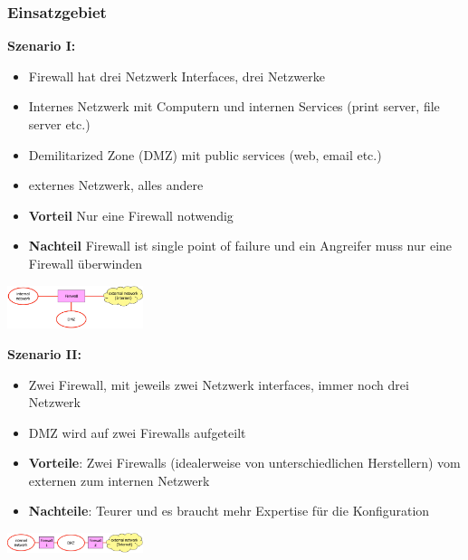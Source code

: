\documentclass{report}
\newenvironment{Figure}
	{\par\medskip\noindent\minipage{\linewidth}}
	{\endminipage\par\medskip}
\theoremstyle{definition}
\theoremstyle{example}
\begin{document}
		\subsubsection{Einsatzgebiet}
\textbf{Szenario I:}\\
\begin{itemize}
	\item Firewall hat drei Netzwerk Interfaces, drei Netzwerke
	\item Internes Netzwerk mit Computern und internen Services (print server, file server etc.)
	\item Demilitarized Zone (DMZ) mit public services (web, email etc.)
	\item externes Netzwerk, alles andere
	\item \textbf{Vorteil} Nur eine Firewall notwendig
	\item \textbf{Nachteil} Firewall ist single point of failure und ein Angreifer muss nur eine Firewall überwinden
\end{itemize}
\begin{Figure}
\centering
\includegraphics[width=150px]{img/PacketFilteringI.png}
	\label{fig:Schema des ersten Packet Filterin Szenario}
\end{Figure}

\textbf{Szenario II:}\\
\begin{itemize}
	\item Zwei Firewall, mit jeweils zwei Netzwerk interfaces, immer noch drei Netzwerk
	\item DMZ wird auf zwei Firewalls aufgeteilt
	\item \textbf{Vorteile}: Zwei Firewalls (idealerweise von unterschiedlichen Herstellern) vom externen zum internen Netzwerk
	\item \textbf{Nachteile}: Teurer und es braucht mehr Expertise für die Konfiguration
\end{itemize}
\begin{Figure}
\centering
\includegraphics[width=150px]{img/PacketFilteringII.png}
	\label{fig:Schema des zweiten Packet Filterin Szenario}
\end{Figure}
		
\end{document}
